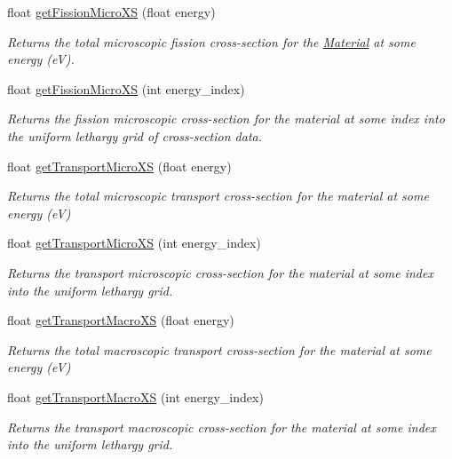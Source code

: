 \begin{DoxyCompactItemize}
float \hyperlink{classMaterial_af1fb57ffc386213ff118c1571c25987c}{get\-Fission\-Micro\-X\-S} (float energy)
\begin{DoxyCompactList}\small\item\em Returns the total microscopic fission cross-\/section for the \hyperlink{classMaterial}{Material} at some energy (e\-V). \end{DoxyCompactList}\item 
float \hyperlink{classMaterial_a2249bd57b535844828cb9acca839ee9d}{get\-Fission\-Micro\-X\-S} (int energy\-\_\-index)
\begin{DoxyCompactList}\small\item\em Returns the fission microscopic cross-\/section for the material at some index into the uniform lethargy grid of cross-\/section data. \end{DoxyCompactList}\item 
float \hyperlink{classMaterial_acdad422a1e93337d5245af481463ed68}{get\-Transport\-Micro\-X\-S} (float energy)
\begin{DoxyCompactList}\small\item\em Returns the total microscopic transport cross-\/section for the material at some energy (e\-V) \end{DoxyCompactList}\item 
float \hyperlink{classMaterial_a144a311226154eaea56631fdbea5d0e4}{get\-Transport\-Micro\-X\-S} (int energy\-\_\-index)
\begin{DoxyCompactList}\small\item\em Returns the transport microscopic cross-\/section for the material at some index into the uniform lethargy grid. \end{DoxyCompactList}\item 
float \hyperlink{classMaterial_ad9c8e9aee38dc558f389d5711c55035b}{get\-Transport\-Macro\-X\-S} (float energy)
\begin{DoxyCompactList}\small\item\em Returns the total macroscopic transport cross-\/section for the material at some energy (e\-V) \end{DoxyCompactList}\item 
float \hyperlink{classMaterial_a6d8003082a563689412ce6416da2b45f}{get\-Transport\-Macro\-X\-S} (int energy\-\_\-index)
\begin{DoxyCompactList}\small\item\em Returns the transport macroscopic cross-\/section for the material at some index into the uniform lethargy grid. \end{DoxyCompactList}\item 

\end{DoxyCompactItemize}
